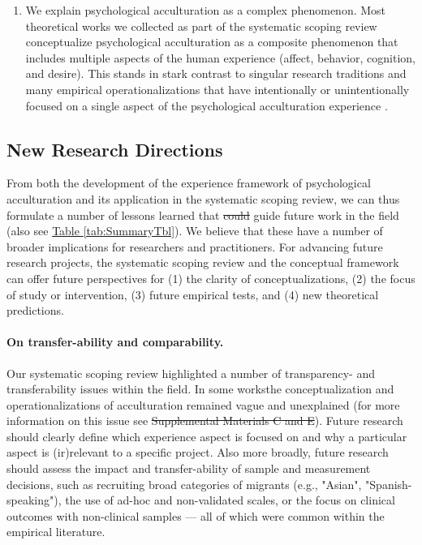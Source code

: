 \documentclass[man, 12pt, a4paper, mask]{apa7}
\newcommand{\tblref}[2][]{\hyperref[#2]{Table \ref*{#2}#1}}
\newcommand{\sicontext}{Supplemental Material D} %
\providecommand{\DIFaddtex}[1]{{\protect\color{blue}\uwave{#1}}} %
\providecommand{\DIFdeltex}[1]{{\protect\color{red}\sout{#1}}}                      %
\providecommand{\DIFaddbegin}{} %
\providecommand{\DIFaddend}{} %
\providecommand{\DIFdelbegin}{} %
\providecommand{\DIFdelend}{} %
\providecommand{\DIFadd}[1]{\texorpdfstring{\DIFaddtex{#1}}{#1}} %
\providecommand{\DIFdel}[1]{\texorpdfstring{\DIFdeltex{#1}}{}} %
\newcommand{\DIFscaledelfig}{0.5}
\newlength{\DIFdelgraphicswidth} %
\newlength{\DIFdelgraphicsheight} %
\newcommand{\DIFaddincludegraphics}[2][]{{\color{blue}\fbox{\DIFOincludegraphics[#1]{#2}}}} %
\newcommand{\DIFdelincludegraphics}[2][]{%
\sbox{\DIFdelgraphicsbox}{\DIFOincludegraphics[#1]{#2}}%
\settoboxwidth{\DIFdelgraphicswidth}{\DIFdelgraphicsbox} %
\settoboxtotalheight{\DIFdelgraphicsheight}{\DIFdelgraphicsbox} %
\scalebox{\DIFscaledelfig}{%
\parbox[b]{\DIFdelgraphicswidth}{\usebox{\DIFdelgraphicsbox}\\[-\baselineskip] \rule{\DIFdelgraphicswidth}{0em}}\llap{\resizebox{\DIFdelgraphicswidth}{\DIFdelgraphicsheight}{%
\setlength{\unitlength}{\DIFdelgraphicswidth}%
\begin{picture}(1,1)%
\thicklines\linethickness{2pt} %
{\color[rgb]{1,0,0}\put(0,0){\framebox(1,1){}}}%
{\color[rgb]{1,0,0}\put(0,0){\line( 1,1){1}}}%
{\color[rgb]{1,0,0}\put(0,1){\line(1,-1){1}}}%
\end{picture}%
}\hspace*{3pt}}} %
} %
\DeclareRobustCommand{\DIFaddbegin}{\DIFOaddbegin \let\includegraphics\DIFaddincludegraphics} %
\DeclareRobustCommand{\DIFaddend}{\DIFOaddend \let\includegraphics\DIFOincludegraphics} %
\DeclareRobustCommand{\DIFdelbegin}{\DIFOdelbegin \let\includegraphics\DIFdelincludegraphics} %
\DeclareRobustCommand{\DIFdelend}{\DIFOaddend \let\includegraphics\DIFOincludegraphics} %
\begin{document}
\begin{enumerate}
\item We explain psychological acculturation as a complex phenomenon. Most theoretical works we collected as part of the systematic scoping review conceptualize psychological acculturation as a composite phenomenon that includes multiple aspects of the human experience (affect, behavior, cognition, and desire). This stands in stark contrast to singular research traditions and many empirical operationalizations that have intentionally or unintentionally focused on a single aspect of the psychological acculturation experience \citep[also see][]{Ward2001}.
\end{enumerate}

\subsection{New Research Directions}
From both the development of the experience framework of psychological acculturation and its application in the systematic scoping review, we can thus formulate a number of lessons learned that \DIFdelbegin \DIFdel{could }\DIFdelend \DIFaddbegin \DIFadd{can help }\DIFaddend guide future work in the field (also see \tblref{tab:SummaryTbl}). We believe that these have a number of broader implications for researchers and practitioners.
For advancing future research projects, the systematic scoping review and the conceptual framework can offer future perspectives for (1) the clarity of conceptualizations, (2) the focus of study or intervention, (3) future empirical tests, and (4) new theoretical predictions. 

\paragraph{On transfer-ability and comparability.} Our systematic scoping review highlighted a number of transparency- and transferability issues within the field. In some works\DIFaddbegin \DIFadd{, }\DIFaddend the conceptualization and operationalizations of acculturation remained vague and unexplained (for more information on this issue see \DIFdelbegin \DIFdel{Supplemental Materials C and E}\DIFdelend \DIFaddbegin \DIFadd{\sicontext}\DIFaddend ). Future research should clearly define which experience aspect is focused on and why a particular aspect is (ir)relevant to a specific project. Also more broadly, future research should assess the impact and transfer-ability of sample and measurement decisions, such as recruiting broad categories of migrants (e.g., "Asian", "Spanish-speaking"), the use of ad-hoc and non-validated scales, or the focus on clinical outcomes with non-clinical samples --- all of which were common within the empirical literature.
\end{document}
